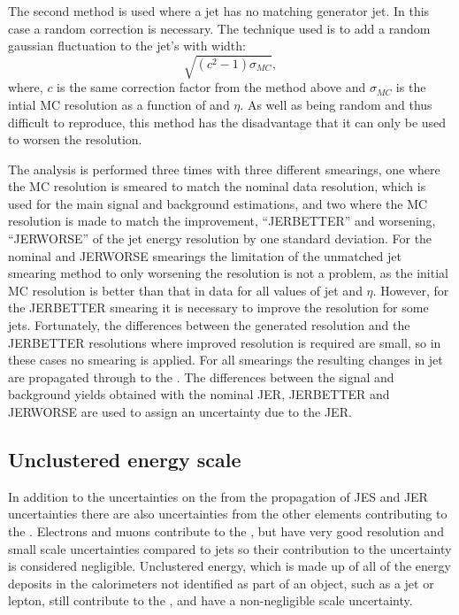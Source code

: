 The second method is used where a jet has no matching generator jet. In this case a random correction is necessary. The technique used is to add a random gaussian fluctuation to the jet's \pt with width:
\begin{equation}
  \label{eq:promptjerunmatched}
  \sqrt{\left(c^{2}-1\right)\sigma_{MC}},
\end{equation}
where, $c$ is the same correction factor from the method above and $\sigma_{MC}$ is the intial \ac{MC} resolution as a function of \pt and $\eta$. As well as being random and thus difficult to reproduce, this method has the disadvantage that it can only be used to worsen the resolution. 

The analysis is performed three times with three different smearings, one where the MC resolution is smeared to match the nominal data resolution, which is used for the main signal and background estimations, and two where the \ac{MC} resolution is made to match the improvement, ``JERBETTER'' and worsening, ``JERWORSE'' of the jet energy resolution by one standard deviation. For the nominal and JERWORSE smearings the limitation of the unmatched jet smearing method to only worsening the resolution is not a problem, as the initial \ac{MC} resolution is better than that in data for all values of jet \pt and $\eta$. However, for the JERBETTER smearing it is necessary to improve the resolution for some jets. Fortunately, the differences between the generated resolution and the JERBETTER resolutions where improved resolution is required are small, so in these cases no smearing is applied. For all smearings the resulting changes in jet \pt are propagated through to the \MET. The differences between the signal and background yields obtained with the nominal \ac{JER}, JERBETTER and JERWORSE are used to assign an uncertainty due to the \ac{JER}.

\subsection{Unclustered energy scale}
\label{sec:promptues}
In addition to the uncertainties on the \MET from the propagation of \ac{JES} and \ac{JER} uncertainties there are also uncertainties from the other elements contributing to the \MET. Electrons and muons contribute to the \MET, but have very good resolution and small scale uncertainties compared to jets so their contribution to the \MET uncertainty is considered negligible. Unclustered energy, which is made up of all of the energy deposits in the calorimeters not identified as part of an object, such as a jet or lepton, still contribute to the \MET, and have a non-negligible scale uncertainty. 

